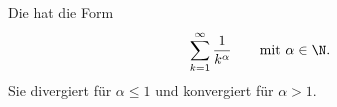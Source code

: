 Die  hat die Form
$$\sum_{k=1}^{\infty} \frac{1}{k^\alpha} \qquad \text{mit $\alpha \in \N$.}$$
Sie divergiert für $\alpha \leq 1$ und konvergiert für $\alpha > 1$.